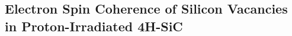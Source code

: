 \documentclass[oneside, astronomy, noacknowlegments]{BYUPhys}
\begin{document}
\begin{appendices}
\chapter{Electron Spin Coherence of Silicon Vacancies in Proton-Irradiated 4H-SiC}
\label{sec:appendc}

\end{appendices}



%
%
%
%







 

 \printindex
\end{document}
